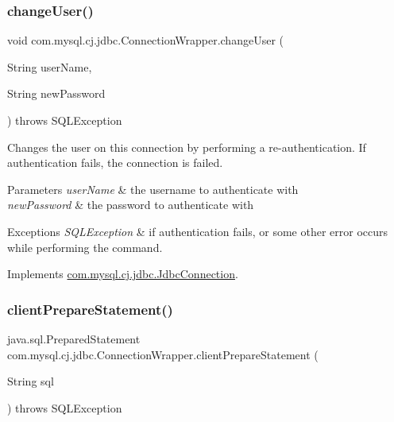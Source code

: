 \subsubsection{\texorpdfstring{change\+User()}{changeUser()}}
{\footnotesize\ttfamily void com.\+mysql.\+cj.\+jdbc.\+Connection\+Wrapper.\+change\+User (\begin{DoxyParamCaption}\item[{String}]{user\+Name,  }\item[{String}]{new\+Password }\end{DoxyParamCaption}) throws S\+Q\+L\+Exception}

Changes the user on this connection by performing a re-\/authentication. If authentication fails, the connection is failed.


\begin{DoxyParams}{Parameters}
{\em user\+Name} & the username to authenticate with \\
\hline
{\em new\+Password} & the password to authenticate with \\
\hline
\end{DoxyParams}

\begin{DoxyExceptions}{Exceptions}
{\em S\+Q\+L\+Exception} & if authentication fails, or some other error occurs while performing the command. \\
\hline
\end{DoxyExceptions}


Implements \mbox{\hyperlink{interfacecom_1_1mysql_1_1cj_1_1jdbc_1_1_jdbc_connection_aed0496e0f2c1236f2784f92b45a482ef}{com.\+mysql.\+cj.\+jdbc.\+Jdbc\+Connection}}.

\mbox{\label{classcom_1_1mysql_1_1cj_1_1jdbc_1_1_connection_wrapper_abec439c58b0b01c1590be391a2d1969a}} 
\subsubsection{\texorpdfstring{client\+Prepare\+Statement()}{clientPrepareStatement()}\hspace{0.1cm}{\footnotesize\ttfamily [1/6]}}
{\footnotesize\ttfamily java.\+sql.\+Prepared\+Statement com.\+mysql.\+cj.\+jdbc.\+Connection\+Wrapper.\+client\+Prepare\+Statement (\begin{DoxyParamCaption}\item[{String}]{sql }\end{DoxyParamCaption}) throws S\+Q\+L\+Exception}

